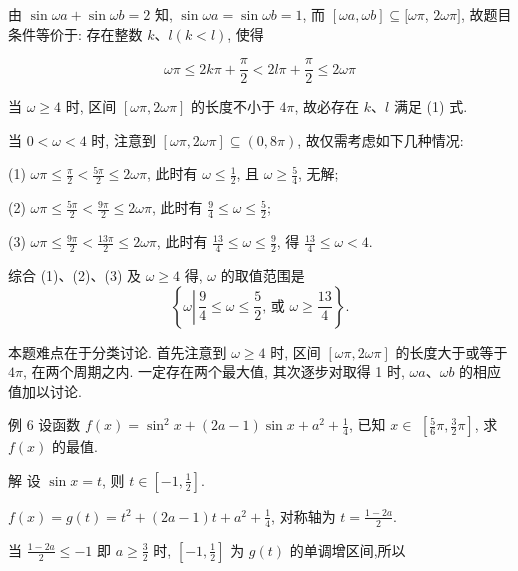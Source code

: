 \begin{solution}
	由 $\sin \omega a+\sin \omega b=2$ 知, $\sin \omega a=\sin \omega b=1$, 而 $[\omega a, \omega b] \subseteq[\omega \pi$, $2 \omega \pi]$, 故题目条件等价于: 存在整数 $k 、 l(k<l)$, 使得

	\begin{equation*}
		\omega \pi \leqslant 2 k \pi+\frac{\pi}{2}<2 l \pi+\frac{\pi}{2} \leqslant 2 \omega \pi \tag{1}
	\end{equation*}

	当 $\omega \geqslant 4$ 时, 区间 $[\omega \pi, 2 \omega \pi]$ 的长度不小于 $4 \pi$, 故必存在 $k 、 l$ 满足 (1) 式.

	当 $0<\omega<4$ 时, 注意到 $[\omega \pi, 2 \omega \pi] \subseteq(0,8 \pi)$, 故仅需考虑如下几种情况:

	(1) $\omega \pi \leqslant \frac{\pi}{2}<\frac{5 \pi}{2} \leqslant 2 \omega \pi$, 此时有 $\omega \leqslant \frac{1}{2}$, 且 $\omega \geqslant \frac{5}{4}$, 无解;

	(2) $\omega \pi \leqslant \frac{5 \pi}{2}<\frac{9 \pi}{2} \leqslant 2 \omega \pi$, 此时有 $\frac{9}{4} \leqslant \omega \leqslant \frac{5}{2}$;

	(3) $\omega \pi \leqslant \frac{9 \pi}{2}<\frac{13 \pi}{2} \leqslant 2 \omega \pi$, 此时有 $\frac{13}{4} \leqslant \omega \leqslant \frac{9}{2}$, 得 $\frac{13}{4} \leqslant \omega<4$.

	综合 (1)、(2)、(3) 及 $\omega \geqslant 4$ 得, $\omega$ 的取值范围是
	$$
		\left\{\omega \left\lvert\, \frac{9}{4} \leqslant \omega \leqslant \frac{5}{2}\right. \text {, 或 } \omega \geqslant \frac{13}{4}\right\} .
	$$
\end{solution}

\begin{note}
	本题难点在于分类讨论. 首先注意到 $\omega \geqslant 4$ 时, 区间 $[\omega \pi, 2 \omega \pi]$ 的长度大于或等于 $4 \pi$, 在两个周期之内. 一定存在两个最大值, 其次逐步对取得 1 时, $\omega a 、 \omega b$ 的相应值加以讨论.
\end{note}

例 6 设函数 $f(x)=\sin ^{2} x+(2 a-1) \sin x+a^{2}+\frac{1}{4}$, 已知 $x \in$ $\left[\frac{5}{6} \pi, \frac{3}{2} \pi\right]$, 求 $f(x)$ 的最值.

解 设 $\sin x=t$, 则 $t \in\left[-1, \frac{1}{2}\right]$.

$f(x)=g(t)=t^{2}+(2 a-1) t+a^{2}+\frac{1}{4}$, 对称轴为 $t=\frac{1-2 a}{2}$.

当 $\frac{1-2 a}{2} \leqslant-1$ 即 $a \geqslant \frac{3}{2}$ 时, $\left[-1, \frac{1}{2}\right]$ 为 $g(t)$ 的单调增区间,所以

